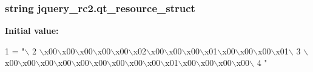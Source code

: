 \subsubsection[{qt\+\_\+resource\+\_\+struct}]{\setlength{\rightskip}{0pt plus 5cm}string jquery\+\_\+rc2.\+qt\+\_\+resource\+\_\+struct}\label{namespacejquery__rc2_a372eed28d2bb82d76a2e17a2af81bd36}
{\bfseries Initial value\+:}
\begin{DoxyCode}
1 = \textcolor{stringliteral}{"\(\backslash\)}
2 \textcolor{stringliteral}{\(\backslash\)x00\(\backslash\)x00\(\backslash\)x00\(\backslash\)x00\(\backslash\)x00\(\backslash\)x02\(\backslash\)x00\(\backslash\)x00\(\backslash\)x00\(\backslash\)x01\(\backslash\)x00\(\backslash\)x00\(\backslash\)x00\(\backslash\)x01\(\backslash\)}
3 \textcolor{stringliteral}{\(\backslash\)x00\(\backslash\)x00\(\backslash\)x00\(\backslash\)x00\(\backslash\)x00\(\backslash\)x00\(\backslash\)x00\(\backslash\)x00\(\backslash\)x00\(\backslash\)x01\(\backslash\)x00\(\backslash\)x00\(\backslash\)x00\(\backslash\)x00\(\backslash\)}
4 \textcolor{stringliteral}{"}
\end{DoxyCode}
